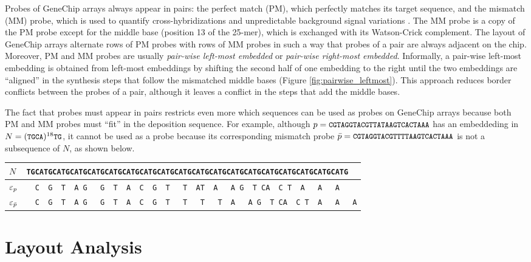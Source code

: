 Probes of GeneChip arrays always appear in pairs: the perfect match (PM), which
perfectly matches its target sequence, and the mismatch (MM) probe, which is
used to quantify cross-hybridizations and unpredictable background signal
variations \citep{Affymetrix2001}. The MM probe is a copy of the PM probe except
for the middle base (position 13 of the 25-mer), which is exchanged with its
Watson-Crick complement. The layout of GeneChip arrays alternate rows of PM
probes with rows of MM probes in such a way that probes of a pair are always
adjacent on the chip. Moreover, PM and MM probes are usually \emph{pair-wise
left-most embedded} or \emph{pair-wise right-most embedded}. Informally, a
pair-wise left-most embedding is obtained from left-most embeddings by shifting
the second half of one embedding to the right until the two embeddings are
``aligned'' in the synthesis steps that follow the mismatched middle bases
(Figure \ref{fig:pairwise_leftmost}). This approach reduces border conflicts
between the probes of a pair, although it leaves a conflict in the steps that
add the middle bases.

The fact that probes must appear in pairs restricts even more which sequences
can be used as probes on GeneChip arrays because both PM and MM probes must
``fit'' in the deposition sequence. For example, although
$p={\text{\small{\tt{CGTAGGTACGTTATAAGTCACTAAA}}}}$ has an embeddeding in
$N=({\text{\small{\tt{TGCA}}}})^{18}{\text{\small{\tt{TG}}}}$, it cannot be used as a probe because its
corresponding mismatch probe $\bar{p}={\text{\small{\tt{CGTAGGTACGTTTTAAGTCACTAAA}}}}$ is not
a subsequence of $N$, as shown below.

\begin{tabular}{lc}
$N$              & \footnotesize{\tt{\verb|TGCATGCATGCATGCATGCATGCATGCATGCATGCATGCATGCATGCATGCATGCATGCATGCATGCATGCATG  |}} \\
\hline
$\varepsilon_p$         & \footnotesize{\tt{\verb|  C  G  T  A G   G  T  A  C  G  T   T  AT  A   A G  T CA  C T  A   A   A    |}} \\
$\varepsilon_{\bar{p}}$ & \footnotesize{\tt{\verb|  C  G  T  A G   G  T  A  C  G  T   T   T   T  A   A G  T CA  C T  A   A   A|}} \\
\hline
\end{tabular}

\section{Layout Analysis}
\label{sec:affy_analysis}

